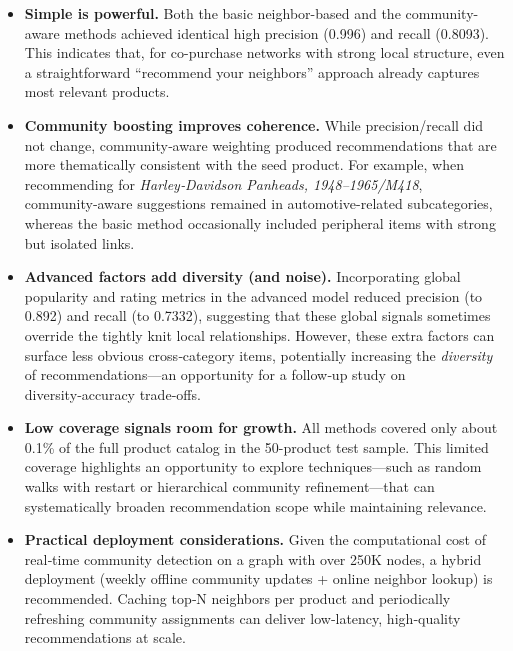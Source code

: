 \documentclass[conference]{IEEEtran}
\begin{document}
\begin{itemize}
  \item \textbf{Simple is powerful.}  
    Both the basic neighbor-based and the community-aware methods achieved identical high precision (0.996) and recall (0.8093). This indicates that, for co-purchase networks with strong local structure, even a straightforward “recommend your neighbors” approach already captures most relevant products.
    
  \item \textbf{Community boosting improves coherence.}  
    While precision/recall did not change, community‑aware weighting produced recommendations that are more thematically consistent with the seed product.  For example, when recommending for \textit{Harley‑Davidson Panheads, 1948–1965/M418}, community‑aware suggestions remained in automotive-related subcategories, whereas the basic method occasionally included peripheral items with strong but isolated links.
    
  \item \textbf{Advanced factors add diversity (and noise).}  
    Incorporating global popularity and rating metrics in the advanced model reduced precision (to 0.892) and recall (to 0.7332), suggesting that these global signals sometimes override the tightly knit local relationships.  However, these extra factors can surface less obvious cross‑category items, potentially increasing the \emph{diversity} of recommendations—an opportunity for a follow‑up study on diversity‑accuracy trade‑offs.
    
  \item \textbf{Low coverage signals room for growth.}  
    All methods covered only about 0.1\% of the full product catalog in the 50-product test sample.  This limited coverage highlights an opportunity to explore techniques—such as random walks with restart or hierarchical community refinement—that can systematically broaden recommendation scope while maintaining relevance.
    
  \item \textbf{Practical deployment considerations.}  
    Given the computational cost of real‑time community detection on a graph with over 250K nodes, a hybrid deployment (weekly offline community updates + online neighbor lookup) is recommended.  Caching top‑N neighbors per product and periodically refreshing community assignments can deliver low‑latency, high‑quality recommendations at scale.
\end{itemize}
\end{document}
